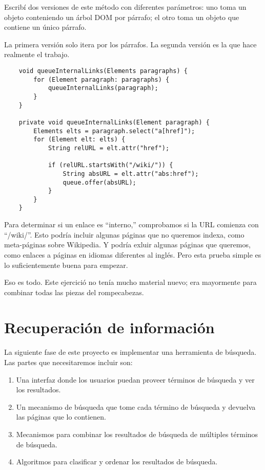 \documentclass[12pt]{book}
\theoremstyle{exercise}
\begin{document}

Escribí dos versiones de este método con diferentes parámetros: uno
toma un objeto  conteniendo un árbol DOM por párrafo;
el otro toma un objeto  que contiene un único párrafo.


La primera versión solo itera por los párrafos. La segunda versión es
la que hace realmente el trabajo.

\begin{verbatim}
    void queueInternalLinks(Elements paragraphs) {
        for (Element paragraph: paragraphs) {
            queueInternalLinks(paragraph);
        }
    }

    private void queueInternalLinks(Element paragraph) {
        Elements elts = paragraph.select("a[href]");
        for (Element elt: elts) {
            String relURL = elt.attr("href");

            if (relURL.startsWith("/wiki/")) {
                String absURL = elt.attr("abs:href");
                queue.offer(absURL);
            }
        }
    }
\end{verbatim}


Para determinar si un enlace es ``interno,'' comprobamos si la URL
comienza con ``/wiki/''. Esto podría incluir algunas páginas que no queremos
indexa, como meta-páginas sobre Wikipedia. Y podría exluir algunas páginas
que queremos, como enlaces a páginas en idiomas diferentes al inglés. Pero esta
prueba simple es lo suficientemente buena para empezar.


Eso es todo. Este ejercició no tenía mucho material nuevo; era mayormente
para combinar todas las piezas del rompecabezas.


\section{Recuperación de información}
\label{information-retrieval}


La siguiente fase de este proyecto es implementar una herramienta de búsqueda.
Las partes que necesitaremos incluir son:

\begin{enumerate}

\item
  Una interfaz donde los usuarios puedan proveer términos de búsqueda y ver los resultados.

\item
  Un mecanismo de búsqueda que tome cada término de búsqueda y devuelva las páginas
  que lo contienen.

\item
  Mecanismos para combinar los resultados de búsqueda de múltiples términos de búsqueda.

\item
  Algoritmos para clasificar y ordenar los resultados de búsqueda.

\end{enumerate}
\end{document}
